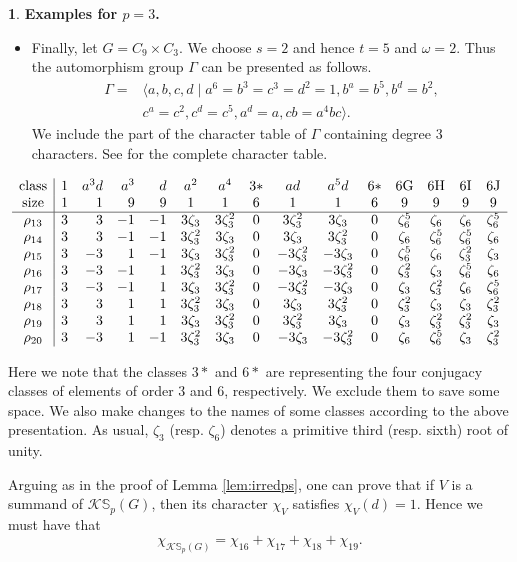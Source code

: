 \documentclass[12pt]{article}
\theoremstyle{plain}
\theoremstyle{definition}
\newtheorem{nothing}[theorem]{}
\newcommand{\kerlin}{\mathbb S_p}
\begin{document}
\begin{nothing}{\bf Examples for $p=3$.}
\begin{itemize}
    Note that when $p>3$, the group $\hat\Gamma_x$ has $p-2>1$ non-trivial irreducible characters and for each of them, we will have an irreducible character of $\Gamma$ induced from $B$. 
    \item Finally, let $G= C_9\times C_3$. We choose $s=2$ and hence $t=5$ and $\omega = 2$. Thus the automorphism group $\Gamma$ can be presented as follows.
    \begin{eqnarray*}
    \Gamma = &\langle a, b, c, d\mid a^6 = b^3 = c^3 = d^2 =1, b^a = b^5, b^d =b^2, \\ & c^a=c^2, c^d = c^5, a^d = a, cb = a^4bc \rangle. 
    \end{eqnarray*}
    We include the part of the character table of $\Gamma$ containing degree $3$ characters. See \cite{Dokchitser} for the complete character table.
\end{itemize}
   
$$
\begin{array}{c|crrrcccccccccc}
  \rm class&\rm1& a^3d&a^3& d&a^2&a^4&\rm3*&ad&a^5d&\rm6*&\rm6G&\rm6H&\rm6I&\rm6J\cr
  \rm size&1&1&9&9&1&1&6&1&1&6&9&9&9&9\cr
\hline
\rho_{13}&3&3&-1&-1&3\zeta_3&3\zeta_3^2&0&3\zeta_3^2&3\zeta_3&0&\zeta_6^5&\zeta_6&\zeta_6&\zeta_6^5\cr
\rho_{14}&3&3&-1&-1&3\zeta_3^2&3\zeta_3&0&3\zeta_3&3\zeta_3^2&0&\zeta_6&\zeta_6^5&\zeta_6^5&\zeta_6\cr
\rho_{15}&3&-3&1&-1&3\zeta_3&3\zeta_3^2&0&-3\zeta_3^2&-3\zeta_3&0&\zeta_6^5&\zeta_6&\zeta_3^2&\zeta_3\cr
\rho_{16}&3&-3&-1&1&3\zeta_3^2&3\zeta_3&0&-3\zeta_3&-3\zeta_3^2&0&\zeta_3^2&\zeta_3&\zeta_6^5&\zeta_6\cr
\rho_{17}&3&-3&-1&1&3\zeta_3&3\zeta_3^2&0&-3\zeta_3^2&-3\zeta_3&0&\zeta_3&\zeta_3^2&\zeta_6&\zeta_6^5\cr
\rho_{18}&3&3&1&1&3\zeta_3^2&3\zeta_3&0&3\zeta_3&3\zeta_3^2&0&\zeta_3^2&\zeta_3&\zeta_3&\zeta_3^2\cr
\rho_{19}&3&3&1&1&3\zeta_3&3\zeta_3^2&0&3\zeta_3^2&3\zeta_3&0&\zeta_3&\zeta_3^2&\zeta_3^2&\zeta_3\cr
\rho_{20}&3&-3&1&-1&3\zeta_3^2&3\zeta_3&0&-3\zeta_3&-3\zeta_3^2&0&\zeta_6&\zeta_6^5&\zeta_3&\zeta_3^2\cr
\end{array}
$$

Here we note that the classes $3*$ and $6*$ are representing the four conjugacy classes of elements of order $3$ and $6$, respectively. We exclude them to save some space. We also make changes to the names of some classes according to the above presentation. As usual, $\zeta_3$ (resp. $\zeta_6$) denotes a primitive third (resp. sixth) root of unity.

Arguing as in the proof of Lemma \ref{lem:irredps}, one can prove that if $V$ is a summand of $\mathcal{K}\kerlin(G)$, then its character $\chi_V$ satisfies $\chi_V(d) = 1.$ 
Hence we must have that
\[
\chi_{\mathcal{K}\kerlin(G)} = \chi_{16} + \chi_{17} + \chi_{18} + \chi_{19}.
\]
\end{nothing}
\end{document}
